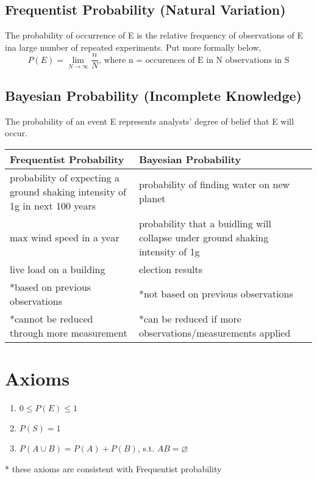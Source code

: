 \vspace{2cm}

\subsection*{Frequentist Probability (Natural Variation)}
The probability of occurrence of E is the relative frequency of observations of E ina large number of repeated experiments. Put more formally below,
\[
    P(E) = \lim_{N\rightarrow\infty}\frac{n}{N} \text{, where n = occurences of E in N observations in S}
\]


\subsection*{Bayesian Probability (Incomplete Knowledge)}
The probability of an event E represents analysts' degree of belief that E will occur.

\vspace{.5cm}

\begin{center}
\begin{tabular}{p{5cm}|p{5cm}}
    Frequentist Probability & Bayesian Probability \\
    \hline
    probability of expecting a ground shaking intensity of 1g in next 100 years & probability of finding water on new planet \\
    \addlinespace
    max wind speed in a year & probability that a buidling will collapse under ground shaking intensity of 1g \\
    \addlinespace
    live load on a building & election results \\
    \addlinespace
    *based on previous observations & *not based on previous observations \\
    \addlinespace
    *cannot be reduced through more measurement & *can be reduced if more observations/measurements applied
\end{tabular}
\end{center}

\section{Axioms}
\begin{enumerate}
    \item $0 \le P(E) \le 1$
    \item  $P(S) = 1$
    \item $P(A \cup B) = P(A) + P(B)$, s.t. $AB = \varnothing$
\end{enumerate}
* these axioms are consistent with Frequentist probability

